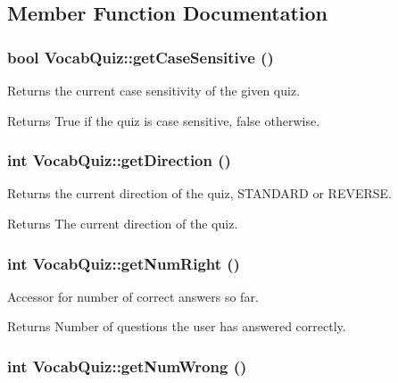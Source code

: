\subsection{Member Function Documentation}
\hypertarget{classVocabQuiz_ad52db1bf5408be282cd76bbdd00c4ac2}{
\subsubsection[{getCaseSensitive}]{\setlength{\rightskip}{0pt plus 5cm}bool VocabQuiz::getCaseSensitive ()}}
\label{classVocabQuiz_ad52db1bf5408be282cd76bbdd00c4ac2}
Returns the current case sensitivity of the given quiz. \begin{DoxyReturn}{Returns}
True if the quiz is case sensitive, false otherwise. 
\end{DoxyReturn}
\hypertarget{classVocabQuiz_a2316cc4ecacdab87d631aabb50ecc2e5}{
\subsubsection[{getDirection}]{\setlength{\rightskip}{0pt plus 5cm}int VocabQuiz::getDirection ()}}
\label{classVocabQuiz_a2316cc4ecacdab87d631aabb50ecc2e5}
Returns the current direction of the quiz, STANDARD or REVERSE. \begin{DoxyReturn}{Returns}
The current direction of the quiz. 
\end{DoxyReturn}
\hypertarget{classVocabQuiz_a62a61345e1ff01acf56ba7e337e6c1fb}{
\subsubsection[{getNumRight}]{\setlength{\rightskip}{0pt plus 5cm}int VocabQuiz::getNumRight ()}}
\label{classVocabQuiz_a62a61345e1ff01acf56ba7e337e6c1fb}
Accessor for number of correct answers so far. \begin{DoxyReturn}{Returns}
Number of questions the user has answered correctly. 
\end{DoxyReturn}
\hypertarget{classVocabQuiz_a53b2eecb43a9ae1bc9d975a5e91d8ad6}{
\subsubsection[{getNumWrong}]{\setlength{\rightskip}{0pt plus 5cm}int VocabQuiz::getNumWrong ()}}
